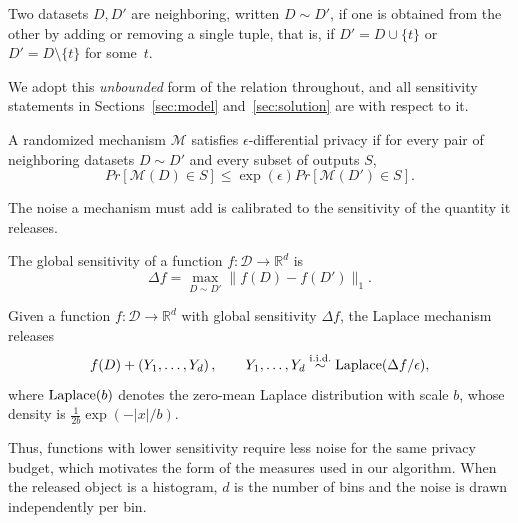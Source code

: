 \begin{definition}
\label{def:neighboring}
Two datasets $D,D'$ are neighboring, written $D\sim D'$, if one is obtained
from the other by adding or removing a single tuple, that is, if
$D'=D\cup\{t\}$ or $D'=D\setminus\{t\}$ for some~$t$.
\end{definition}

We adopt this \emph{unbounded} form of the relation throughout, and all sensitivity
statements in Sections~\ref{sec:model} and~\ref{sec:solution} are with respect to
it.

\begin{definition}
A randomized mechanism $\mathcal{M}$ satisfies $\epsilon$-differential privacy if for
every pair of neighboring datasets $D\sim D'$ and every subset of outputs $S$,
\[
Pr[\mathcal{M}(D)\in S]
\leq
\exp(\epsilon)
Pr[\mathcal{M}(D')\in S].
\]
\end{definition}

The noise a mechanism must add is calibrated to the sensitivity of the quantity it
releases.

\begin{definition}
\label{def:global-sensitivity}
The global sensitivity of a function $f:\mathcal{D}\rightarrow\mathbb{R}^d$ is
\[
\Delta f
=
\max_{D\sim D'}
\|f(D)-f(D')\|_1 .
\]
\end{definition}

\begin{definition}
\label{def:laplace-mechanism}
Given a function $f:\mathcal{D}\rightarrow\mathbb{R}^d$ with global sensitivity
$\Delta f$, the Laplace mechanism releases
\[
f(D)+\left(Y_1,\ldots,Y_d\right),
\qquad
Y_1,\ldots,Y_d \stackrel{\text{i.i.d.}}{\sim} \operatorname{Laplace}(\Delta f/\epsilon),
\]
where $\operatorname{Laplace}(b)$ denotes the zero-mean Laplace distribution with scale $b$, whose
density is $\frac{1}{2b}\exp(-|x|/b)$.
\end{definition}

Thus, functions with lower sensitivity require less noise for the same
privacy budget, which motivates the form of the measures used in
our algorithm.
When the released object is a histogram, $d$ is the number of bins and the noise is
drawn independently per bin.

